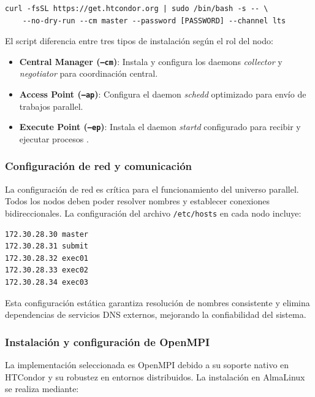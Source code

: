 \begin{verbatim}
curl -fsSL https://get.htcondor.org | sudo /bin/bash -s -- \
    --no-dry-run --cm master --password [PASSWORD] --channel lts
\end{verbatim}

El script diferencia entre tres tipos de instalación según el rol del nodo:

\begin{itemize}
	\item \textbf{Central Manager (\texttt{--cm})}: Instala y configura los daemons \textit{collector} y \textit{negotiator} para coordinación central.
	
	\item \textbf{Access Point (\texttt{--ap})}: Configura el daemon \textit{schedd} optimizado para envío de trabajos parallel.
	
	\item \textbf{Execute Point (\texttt{--ep})}: Instala el daemon \textit{startd} configurado para recibir y ejecutar procesos \MPI.
\end{itemize}

\subsubsection{Configuración de red y comunicación}
\noindent

La configuración de red es crítica para el funcionamiento del universo parallel. Todos los nodos deben poder resolver nombres y establecer conexiones bidireccionales. La configuración del archivo \texttt{/etc/hosts} en cada nodo incluye:

\begin{verbatim}
172.30.28.30 master
172.30.28.31 submit
172.30.28.32 exec01
172.30.28.33 exec02
172.30.28.34 exec03
\end{verbatim}

Esta configuración estática garantiza resolución de nombres consistente y elimina dependencias de servicios DNS externos, mejorando la confiabilidad del sistema.

\subsubsection{Instalación y configuración de OpenMPI}
\noindent

La implementación \MPI seleccionada es OpenMPI debido a su soporte nativo en HTCondor y su robustez en entornos distribuidos. La instalación en AlmaLinux se realiza mediante:

